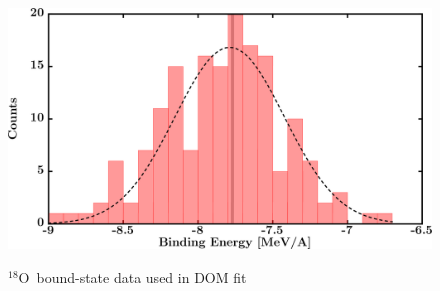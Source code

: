 \documentclass[twocolumn,secnumarabic,amssymb, nobibnotes, aps, prl,
superscriptaddress, nobalancelastpage]{revtex4}
\newcommand{\oEight}{\ensuremath{^{18}}O}
\begin{document}
\begin{figure}[!htb]
\begin{minipage}{0.4\linewidth}
        \label{DOM_o18_RMSRadius}
    \end{minipage}
    \begin{minipage}{0.4\linewidth}
        \centering
        \includegraphics[width=\linewidth]{figures/o18_BE.png}
        \label{DOM_o18_BE}
    \end{minipage}
    \caption{\oEight\ bound-state data used in DOM fit}
    \label{DOM_o18_structural}
\end{figure}
\end{document}
